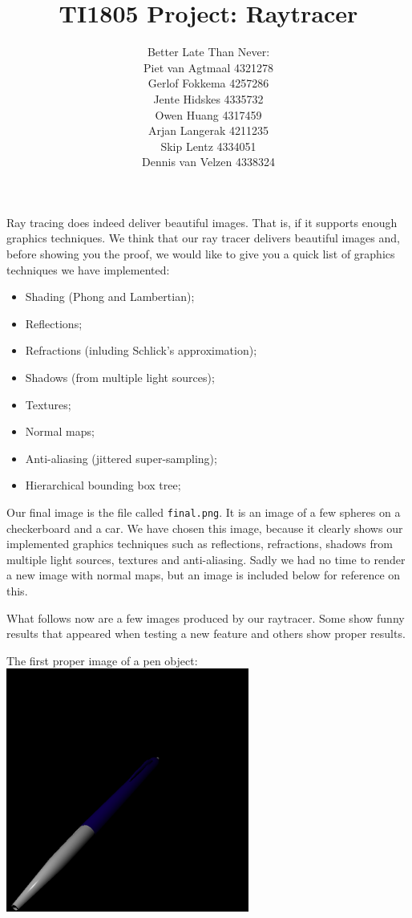 \documentclass[a4paper,11pt]{article}
\title{TI1805 Project: Raytracer}
\author{Better Late Than Never:\\
		Piet van Agtmaal 4321278\\
		Gerlof Fokkema 4257286\\
		Jente Hidskes 4335732\\
		Owen Huang 4317459\\
		Arjan Langerak 4211235\\
		Skip Lentz 4334051\\
		Dennis van Velzen 4338324\\
	   }
\begin{document}
\maketitle
Ray tracing does indeed deliver beautiful images. That is, if it supports enough graphics techniques. We think that our ray tracer delivers beautiful images and, before showing you the proof, we would like to give you a quick list of graphics techniques we have implemented:
\begin{itemize}
	\item Shading (Phong and Lambertian);
	\item Reflections;
	\item Refractions (inluding Schlick's approximation);
	\item Shadows (from multiple light sources);
	\item Textures;
	\item Normal maps;
	\item Anti-aliasing (jittered super-sampling);
	\item Hierarchical bounding box tree;
\end{itemize}

Our final image is the file called \texttt{final.png}. It is an image of a few spheres on a checkerboard and a car. We have chosen this image, because it clearly shows our implemented graphics techniques such as reflections, refractions, shadows from multiple light sources, textures and anti-aliasing. Sadly we had no time to render a new image with normal maps, but an image is included below for reference on this.

What follows now are a few images produced by our raytracer. Some show funny results that appeared when testing a new feature and others show proper results.

\newpage The first proper image of a pen object:\\
\includegraphics[keepaspectratio,width=8.0cm]{images/interpolate_pen}
\end{document}

